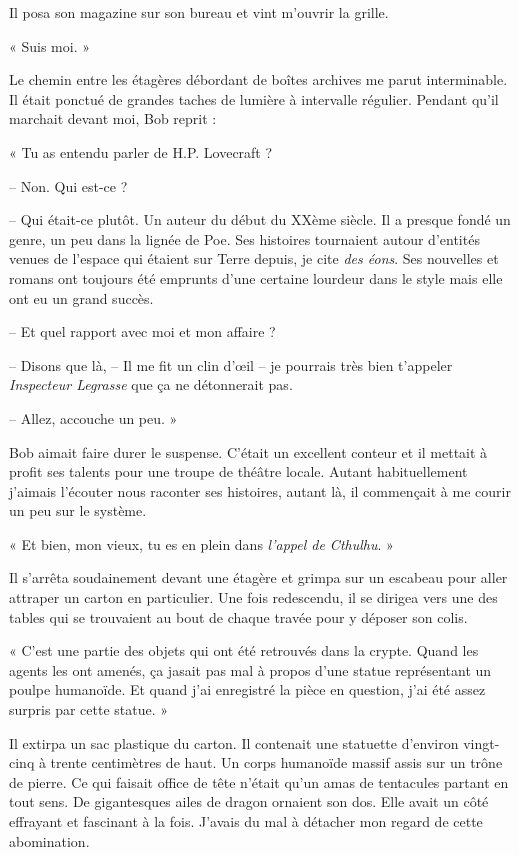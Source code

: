 Il posa son magazine sur son bureau et vint m'ouvrir la grille.

« Suis moi. »

Le chemin entre les étagères débordant de boîtes archives me parut interminable. Il était ponctué de grandes taches de
lumière à intervalle régulier. Pendant qu'il marchait devant moi, Bob reprit :

« Tu as entendu parler de H.P. Lovecraft ?

-- Non. Qui est-ce ?

-- Qui était-ce plutôt. Un auteur du début du XXème siècle. Il a presque fondé un genre, un peu dans la lignée de Poe.
Ses histoires tournaient autour d'entités venues de l'espace qui étaient sur Terre depuis, je cite \emph{des éons}. Ses
nouvelles et romans ont toujours été emprunts d'une certaine lourdeur dans le style mais elle ont eu un grand succès.

-- Et quel rapport avec moi et mon affaire ?

-- Disons que là, -- Il me fit un clin d'œil -- je pourrais très bien t'appeler \emph{Inspecteur Legrasse} que ça ne
détonnerait pas.

-- Allez, accouche un peu. »

Bob aimait faire durer le suspense. C'était un excellent conteur et il mettait à profit ses talents pour une troupe de
théâtre locale. Autant habituellement j'aimais l'écouter nous raconter ses histoires, autant là, il commençait à me
courir un peu sur le système.

« Et bien, mon vieux, tu es en plein dans \emph{l'appel de Cthulhu}. »

Il s'arrêta soudainement devant une étagère et grimpa sur un escabeau pour aller attraper un carton en particulier. Une
fois redescendu, il se dirigea vers une des tables qui se trouvaient au bout de chaque travée pour y déposer son colis.

« C'est une partie des objets qui ont été retrouvés dans la crypte. Quand les agents les ont amenés, ça jasait pas mal
à propos d'une statue représentant un poulpe humanoïde. Et quand j'ai enregistré la pièce en question, j'ai été assez
surpris par cette statue. »

Il extirpa un sac plastique du carton. Il contenait une statuette d'environ vingt-cinq à trente centimètres de haut. Un
corps humanoïde massif assis sur un trône de pierre. Ce qui faisait office de tête n'était qu'un amas de tentacules
partant en tout sens. De gigantesques ailes de dragon ornaient son dos. Elle avait un côté effrayant et fascinant à la
fois. J'avais du mal à détacher mon regard de cette abomination.

